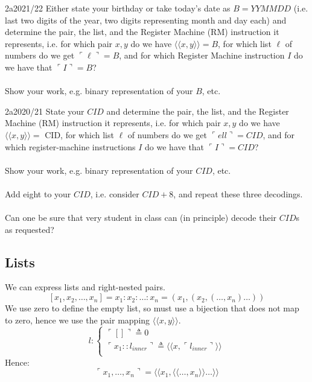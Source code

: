 \begin{exambox}{2a}{2021/22}
	Either state your birthday or take today's date as $B = YYMMDD$ (i.e. last two
	digits of the year, two digits representing month and day each) and determine the
	pair, the list, and the Register Machine (RM) instruction it represents, i.e. for
	which pair $x, y$ do we have $\langle \langle x, y \rangle \rangle = B$, for which list $\ell$ of numbers do we get
	$\ulcorner \ell \urcorner = B$, and for which Register Machine instruction $I$ do we have that
	$\ulcorner I \urcorner = B$?  
	\\
	\\ Show your work, e.g. binary representation of your $B$, etc.
\end{exambox}
\begin{exambox}{2a}{2020/21}
	State your $CID$ and determine the pair, the list, and the Register Machine (RM)
	instruction it represents, i.e. for which pair $x, y$ do we have $\langle \langle x, y \rangle \rangle = $ CID, for
	which list $\ell$ of numbers do we get $\ulcorner ell \urcorner = CID$, and for which register-machine
	instructions $I$ do we have that $\ulcorner I \urcorner = CID$? 
	\\
	\\ Show your work, e.g. binary representation of your $CID$, etc.
	\\
	\\ Add eight to your $CID$, i.e. consider $CID+8$, and repeat these three decodings.
	\\
	\\ Can one be sure that very student in class can (in principle) decode their $CID$s as requested?
\end{exambox}

\subsection{Lists}
We can express lists and right-nested pairs.
\[[x_1, x_2, \dots, x_n] = x_1:x_2:\dots:x_n = (x_1, (x_2, (\dots, x_n) \dots ))\]
We use zero to define the empty list, so must use a bijection that does not map to zero, hence we use the pair mapping $\langle\langle x,y \rangle\rangle$.
\[l : \begin{cases}
		\ulcorner [] \urcorner \triangleq 0                                                                            \\
		\ulcorner x_1 :: l_{inner} \urcorner \triangleq \langle\langle x, \ulcorner l_{inner} \urcorner \rangle\rangle \\
	\end{cases}\]
Hence:
\[\ulcorner x_1, \dots, x_n \urcorner = \langle\langle x_1 , \langle\langle \dots, x_n\rangle\rangle \dots \rangle\rangle\]
